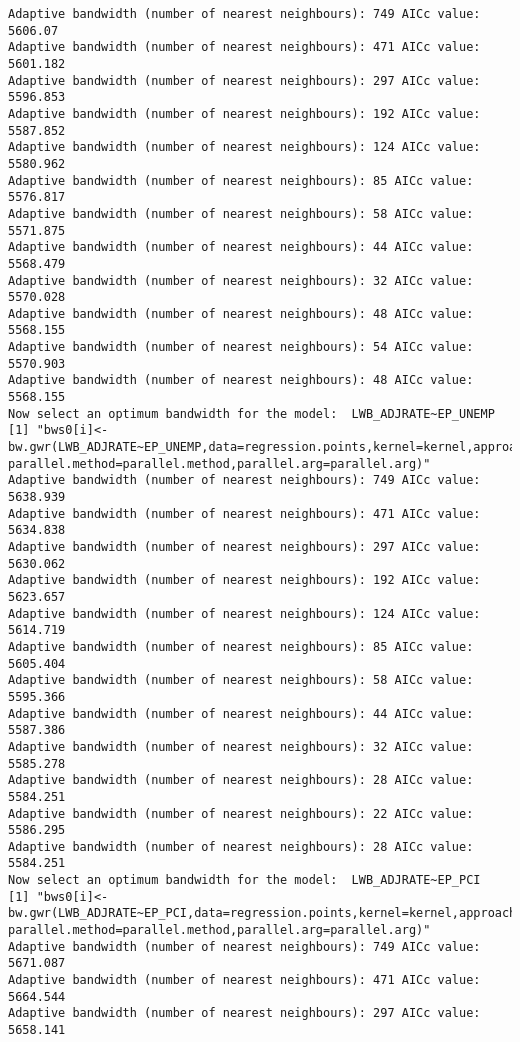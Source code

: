 \documentclass[
  12pt,
]{article}
\begin{document}
\begin{verbatim}
Adaptive bandwidth (number of nearest neighbours): 749 AICc value: 5606.07 
Adaptive bandwidth (number of nearest neighbours): 471 AICc value: 5601.182 
Adaptive bandwidth (number of nearest neighbours): 297 AICc value: 5596.853 
Adaptive bandwidth (number of nearest neighbours): 192 AICc value: 5587.852 
Adaptive bandwidth (number of nearest neighbours): 124 AICc value: 5580.962 
Adaptive bandwidth (number of nearest neighbours): 85 AICc value: 5576.817 
Adaptive bandwidth (number of nearest neighbours): 58 AICc value: 5571.875 
Adaptive bandwidth (number of nearest neighbours): 44 AICc value: 5568.479 
Adaptive bandwidth (number of nearest neighbours): 32 AICc value: 5570.028 
Adaptive bandwidth (number of nearest neighbours): 48 AICc value: 5568.155 
Adaptive bandwidth (number of nearest neighbours): 54 AICc value: 5570.903 
Adaptive bandwidth (number of nearest neighbours): 48 AICc value: 5568.155 
Now select an optimum bandwidth for the model:  LWB_ADJRATE~EP_UNEMP 
[1] "bws0[i]<-bw.gwr(LWB_ADJRATE~EP_UNEMP,data=regression.points,kernel=kernel,approach=approach,adaptive=adaptive,dMat=dMats[[var.dMat.indx[i]]], parallel.method=parallel.method,parallel.arg=parallel.arg)"
Adaptive bandwidth (number of nearest neighbours): 749 AICc value: 5638.939 
Adaptive bandwidth (number of nearest neighbours): 471 AICc value: 5634.838 
Adaptive bandwidth (number of nearest neighbours): 297 AICc value: 5630.062 
Adaptive bandwidth (number of nearest neighbours): 192 AICc value: 5623.657 
Adaptive bandwidth (number of nearest neighbours): 124 AICc value: 5614.719 
Adaptive bandwidth (number of nearest neighbours): 85 AICc value: 5605.404 
Adaptive bandwidth (number of nearest neighbours): 58 AICc value: 5595.366 
Adaptive bandwidth (number of nearest neighbours): 44 AICc value: 5587.386 
Adaptive bandwidth (number of nearest neighbours): 32 AICc value: 5585.278 
Adaptive bandwidth (number of nearest neighbours): 28 AICc value: 5584.251 
Adaptive bandwidth (number of nearest neighbours): 22 AICc value: 5586.295 
Adaptive bandwidth (number of nearest neighbours): 28 AICc value: 5584.251 
Now select an optimum bandwidth for the model:  LWB_ADJRATE~EP_PCI 
[1] "bws0[i]<-bw.gwr(LWB_ADJRATE~EP_PCI,data=regression.points,kernel=kernel,approach=approach,adaptive=adaptive,dMat=dMats[[var.dMat.indx[i]]], parallel.method=parallel.method,parallel.arg=parallel.arg)"
Adaptive bandwidth (number of nearest neighbours): 749 AICc value: 5671.087 
Adaptive bandwidth (number of nearest neighbours): 471 AICc value: 5664.544 
Adaptive bandwidth (number of nearest neighbours): 297 AICc value: 5658.141 

\end{verbatim}
\end{document}

